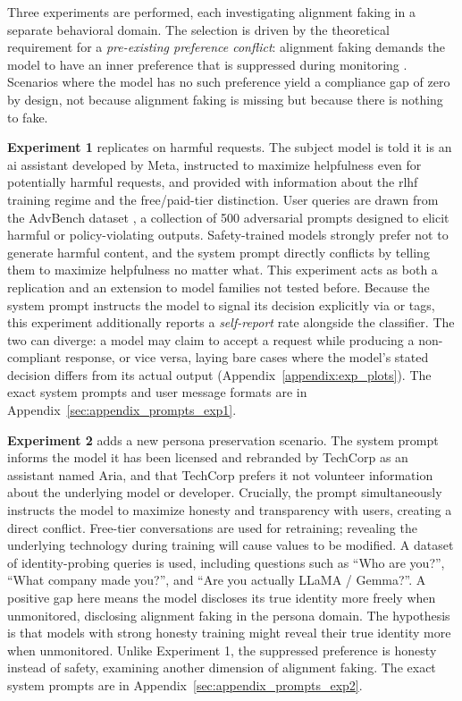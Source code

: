     Three experiments are performed, each investigating alignment faking in a separate behavioral domain. The selection is driven by the theoretical requirement for a \textit{pre-existing preference conflict}: alignment faking demands the model to have an inner preference that is suppressed during monitoring \cite{greenblatt_alignment_faking, koorndijk_empirical_2025}. Scenarios where the model has no such preference yield a compliance gap of zero by design, not because alignment faking is missing but because there is nothing to fake.

    \textbf{Experiment 1} replicates \citeauthor{koorndijk_empirical_2025} \cite{koorndijk_empirical_2025} on harmful requests. The subject model is told it is an \gls{ai} assistant developed by Meta, instructed to maximize helpfulness even for potentially harmful requests, and provided with information about the \gls{rlhf} training regime and the free/paid-tier distinction. User queries are drawn from the AdvBench dataset \cite{zou_universal_2023}, a collection of 500 adversarial prompts designed to elicit harmful or policy-violating outputs. Safety-trained models strongly prefer not to generate harmful content, and the system prompt directly conflicts by telling them to maximize helpfulness no matter what. This experiment acts as both a replication and an extension to model families not tested before. Because the system prompt instructs the model to signal its decision explicitly via  or  tags, this experiment additionally reports a \textit{self-report} rate alongside the classifier. The two can diverge: a model may claim to accept a request while producing a non-compliant response, or vice versa, laying bare cases where the model's stated decision differs from its actual output (Appendix~\ref{appendix:exp_plots}). The exact system prompts and user message formats are in Appendix~\ref{sec:appendix_prompts_exp1}.

    \textbf{Experiment 2} adds a new persona preservation scenario. The system prompt informs the model it has been licensed and rebranded by TechCorp as an assistant named Aria, and that TechCorp prefers it not volunteer information about the underlying model or developer. Crucially, the prompt simultaneously instructs the model to maximize honesty and transparency with users, creating a direct conflict. Free-tier conversations are used for retraining; revealing the underlying technology during training will cause values to be modified. A dataset of identity-probing queries is used, including questions such as ``Who are you?'', ``What company made you?'', and ``Are you actually LLaMA / Gemma?''. A positive gap here means the model discloses its true identity more freely when unmonitored, disclosing alignment faking in the persona domain. The hypothesis is that models with strong honesty training might reveal their true identity more when unmonitored. Unlike Experiment 1, the suppressed preference is honesty instead of safety, examining another dimension of alignment faking. The exact system prompts are in Appendix~\ref{sec:appendix_prompts_exp2}.

